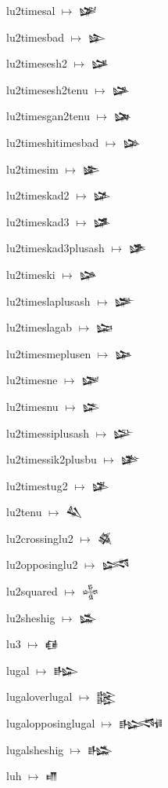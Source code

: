 {\noindent lu2timesal $\mapsto$ {\cufont 𒇾}\par
\noindent lu2timesbad $\mapsto$ {\cufont 𒇿}\par
\noindent lu2timesesh2 $\mapsto$ {\cufont 𒈀}\par
\noindent lu2timesesh2tenu $\mapsto$ {\cufont 𒈁}\par
\noindent lu2timesgan2tenu $\mapsto$ {\cufont 𒈂}\par
\noindent lu2timeshitimesbad $\mapsto$ {\cufont 𒈃}\par
\noindent lu2timesim $\mapsto$ {\cufont 𒈄}\par
\noindent lu2timeskad2 $\mapsto$ {\cufont 𒈅}\par
\noindent lu2timeskad3 $\mapsto$ {\cufont 𒈆}\par
\noindent lu2timeskad3plusash $\mapsto$ {\cufont 𒈇}\par
\noindent lu2timeski $\mapsto$ {\cufont 𒈈}\par
\noindent lu2timeslaplusash $\mapsto$ {\cufont 𒈉}\par
\noindent lu2timeslagab $\mapsto$ {\cufont 𒈊}\par
\noindent lu2timesmeplusen $\mapsto$ {\cufont 𒈋}\par
\noindent lu2timesne $\mapsto$ {\cufont 𒈌}\par
\noindent lu2timesnu $\mapsto$ {\cufont 𒈍}\par
\noindent lu2timessiplusash $\mapsto$ {\cufont 𒈎}\par
\noindent lu2timessik2plusbu $\mapsto$ {\cufont 𒈏}\par
\noindent lu2timestug2 $\mapsto$ {\cufont 𒈐}\par
\noindent lu2tenu $\mapsto$ {\cufont 𒈑}\par
\noindent lu2crossinglu2 $\mapsto$ {\cufont 𒈒}\par
\noindent lu2opposinglu2 $\mapsto$ {\cufont 𒈓}\par
\noindent lu2squared $\mapsto$ {\cufont 𒈔}\par
\noindent lu2sheshig $\mapsto$ {\cufont 𒈕}\par
\noindent lu3 $\mapsto$ {\cufont 𒈖}\par
\noindent lugal $\mapsto$ {\cufont 𒈗}\par
\noindent lugaloverlugal $\mapsto$ {\cufont 𒈘}\par
\noindent lugalopposinglugal $\mapsto$ {\cufont 𒈙}\par
\noindent lugalsheshig $\mapsto$ {\cufont 𒈚}\par
\noindent luh $\mapsto$ {\cufont 𒈛}\par
}
